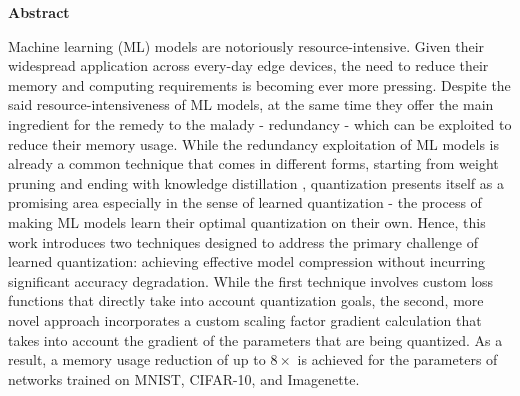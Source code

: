 \thispagestyle{empty}
\vspace*{1.0cm}

\begin{center}
    \textbf{Abstract} \label{abstract}
\end{center}

\vspace*{0.5cm}

\noindent Machine learning (ML) models are notoriously resource-intensive.
Given their widespread application across every-day edge devices,
the need to reduce their memory and computing requirements is becoming ever more pressing.
Despite the said resource-intensiveness of ML models, at the same time 
they offer the main ingredient for the remedy to the malady - redundancy - 
which can be exploited to reduce their memory usage.
While the redundancy exploitation of ML models is already a common 
technique that comes in different forms, starting from weight pruning  \cite{DBLP:conf/nips/CunDS89} \cite{DBLP:conf/iclr/MolchanovTKAK17}\cite{han2016deepcompression} and
ending with knowledge distillation \cite{DBLP:journals/corr/HintonVD15} \cite{DBLP:conf/icmlt/OkadoMIKS22}, quantization presents itself as a promising 
area especially in the sense of learned quantization - 
the process of making ML models learn their optimal quantization
on their own.
Hence, this work introduces two techniques designed to address the primary challenge of learned quantization:
achieving effective model compression without incurring significant accuracy degradation.
While the first technique involves custom loss functions that directly take into account
quantization goals, the second, more novel approach incorporates a custom scaling factor gradient calculation that takes into account 
the gradient of the parameters that are being quantized.
As a result, a memory usage reduction of up to \( 8 \times \) is achieved for the parameters of networks
trained on MNIST, CIFAR-10, and Imagenette. 